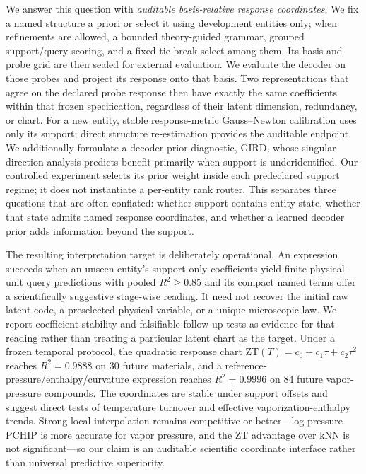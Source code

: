 We answer this question with \emph{auditable basis-relative response
coordinates}.  We fix a named structure a priori or select it using
development entities only; when refinements are allowed, a bounded theory-guided grammar, grouped
support/query scoring, and a fixed tie break select among them.  Its basis and
probe grid are then sealed for external evaluation.  We evaluate the decoder on
those probes and project its response
onto that basis.  Two representations that agree on the declared probe response
then have exactly the same coefficients within that frozen specification, regardless of their latent
dimension, redundancy, or chart.  For a new entity, stable response-metric
  Gauss--Newton calibration uses only its support; direct structure re-estimation
provides the auditable endpoint.  We additionally formulate a decoder-prior
diagnostic, GIRD, whose singular-direction analysis predicts benefit primarily
when support is underidentified.  Our controlled experiment selects its prior
weight inside each predeclared support regime; it does not instantiate a
per-entity rank router.  This separates three
questions that are often conflated: whether support contains entity state,
whether that state admits named response coordinates, and whether a learned
decoder prior adds information beyond the support.

The resulting interpretation target is deliberately operational.  An expression
succeeds when an unseen entity's support-only coefficients yield finite
physical-unit query predictions with pooled $R^2\geq0.85$ and its compact named
terms offer a scientifically suggestive stage-wise reading.  It need not recover
the initial raw latent code, a preselected physical variable, or a unique
microscopic law.  We report coefficient stability and falsifiable follow-up tests
as evidence for that reading rather than treating a particular latent chart as
the target.  Under a frozen temporal protocol, the
quadratic response chart
$\mathrm{ZT}(T)=c_0+c_1\tau+c_2\tau^2$ reaches $R^2=0.9888$ on 30 future
materials, and a reference-pressure/enthalpy/curvature expression reaches
$R^2=0.9996$ on 84 future vapor-pressure compounds.  The coordinates are stable
under support offsets and suggest direct tests of temperature turnover and
effective vaporization-enthalpy trends.  Strong local interpolation remains
competitive or better---log-pressure PCHIP is more accurate for vapor pressure, and the ZT
advantage over kNN is not significant---so our claim is an auditable scientific
coordinate interface rather than universal predictive superiority.

